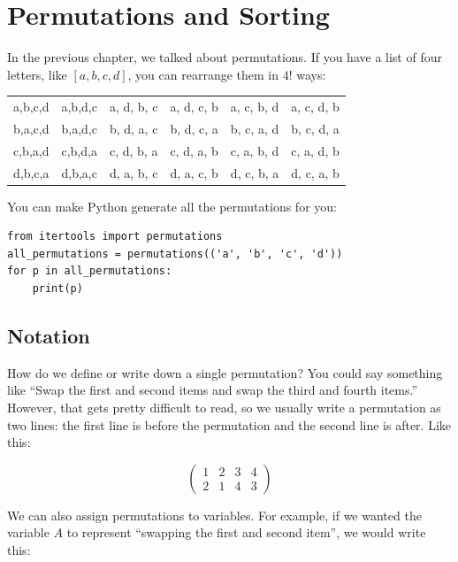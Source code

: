 \chapter{Permutations and Sorting}

In the previous chapter, we talked about permutations. If you have a list
of four letters, like $[a, b, c, d]$, you can rearrange them in $4!$
ways:

\begin{tabular}{c c c c c c}
  a,b,c,d & a,b,d,c & a, d, b, c & a, d, c, b & a, c, b, d & a, c, d, b \\
  b,a,c,d & b,a,d,c & b, d, a, c & b, d, c, a & b, c, a, d & b, c, d, a \\
  c,b,a,d & c,b,d,a & c, d, b, a & c, d, a, b & c, a, b, d & c, a, d, b \\
  d,b,c,a & d,b,a,c & d, a, b, c & d, a, c, b & d, c, b, a & d, c, a, b
\end{tabular}

You can make Python generate all the permutations for you:

\begin{verbatim}
from itertools import permutations
all_permutations = permutations(('a', 'b', 'c', 'd'))
for p in all_permutations:
    print(p)
\end{verbatim}

\section{Notation}

How do we define or write down a single permutation? You could say
something like ``Swap the first and second items and swap the third
and fourth items.'' However, that gets pretty difficult to read, so we
usually write a permutation as two lines: the first line is before
the permutation and the second line is after.  Like this:

$$\begin{pmatrix}
  1 & 2 & 3 & 4 \\
  2 & 1 & 4 & 3
\end{pmatrix}$$

We can also assign permutations to variables. For example, if we wanted the
variable $A$ to represent ``swapping the first and second item'', we
would write this:

